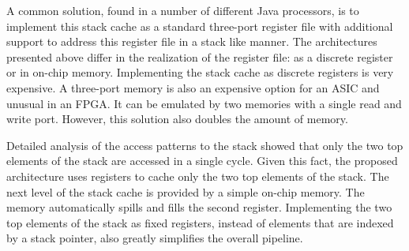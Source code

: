 A common solution, found in a number of different Java processors,
is to implement this stack cache as a standard three-port register
file with additional support to address this register file in a
stack like manner. The architectures presented above differ in the
realization of the register file: as a discrete register or in
on-chip memory. Implementing the stack cache as discrete registers
is very expensive. A three-port memory is also an expensive option
for an ASIC and unusual in an FPGA. It can be emulated by two
memories with a single read and write port. However, this solution
also doubles the amount of memory.

Detailed analysis of the access patterns to the stack showed that
only the two top elements of the stack are accessed in a single
cycle. Given this fact, the proposed architecture uses registers to
cache only the two top elements of the stack. The next level of the
stack cache is provided by a simple on-chip memory. The memory
automatically spills and fills the second register. Implementing the
two top elements of the stack as fixed registers, instead of elements
that are indexed by a stack pointer, also greatly simplifies the
overall pipeline.
